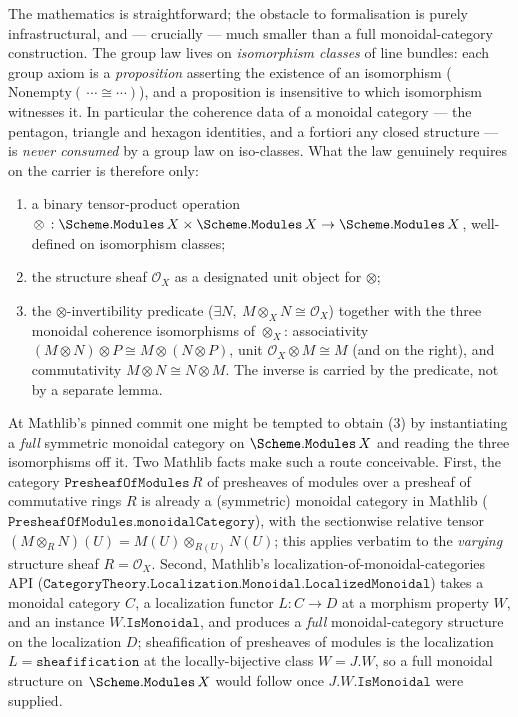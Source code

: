 The mathematics is straightforward; the obstacle to formalisation is purely
infrastructural, and --- crucially --- much smaller than a full
monoidal-category construction. The group law lives on \emph{isomorphism
classes} of line bundles: each group axiom is a \emph{proposition} asserting
the existence of an isomorphism (\(\mathrm{Nonempty}(\,\cdots \cong \cdots)\)),
and a proposition is insensitive to which isomorphism witnesses it. In
particular the coherence data of a monoidal category --- the pentagon,
triangle and hexagon identities, and a fortiori any closed structure --- is
\emph{never consumed} by a group law on iso-classes. What the law genuinely
requires on the carrier is therefore only:
\begin{enumerate}
  \item a binary tensor-product operation
    \(\otimes\, : \Scheme.\mathtt{Modules}\,X \times \Scheme.\mathtt{Modules}\,X
                  \to \Scheme.\mathtt{Modules}\,X\), well-defined on
    isomorphism classes;
  \item the structure sheaf \(\mathcal{O}_X\) as a designated unit object
    for \(\otimes\);
  \item the \(\otimes\)-invertibility predicate
    (\(\exists N,\ M \otimes_X N \cong \mathcal{O}_X\)) together with the three
    monoidal coherence isomorphisms of \(\otimes_X\): associativity
    \((M \otimes N) \otimes P \cong M \otimes (N \otimes P)\), unit
    \(\mathcal{O}_X \otimes M \cong M\) (and on the right), and commutativity
    \(M \otimes N \cong N \otimes M\). The inverse is carried by the
    predicate, not by a separate lemma.
\end{enumerate}
At Mathlib's pinned commit one might be tempted to obtain (3) by instantiating a
\emph{full} symmetric monoidal category on \(\Scheme.\mathtt{Modules}\,X\) and
reading the three isomorphisms off it. Two Mathlib facts make such a route
conceivable. First, the category \(\mathtt{PresheafOfModules}\,R\) of presheaves
of modules over a presheaf of commutative rings \(R\) is already a (symmetric)
monoidal category in Mathlib (\(\mathtt{PresheafOfModules.monoidalCategory}\)),
with the sectionwise relative tensor \((M \otimes_R N)(U) = M(U) \otimes_{R(U)}
N(U)\); this applies verbatim to the \emph{varying} structure sheaf
\(R = \mathcal{O}_X\). Second, Mathlib's localization-of-monoidal-categories API
(\(\mathtt{CategoryTheory.Localization.Monoidal.LocalizedMonoidal}\)) takes a
monoidal category \(C\), a localization functor \(L : C \to D\) at a morphism
property \(W\), and an instance \(W.\mathtt{IsMonoidal}\), and produces a
\emph{full} monoidal-category structure on the localization \(D\); sheafification
of presheaves of modules is the localization \(L = \mathtt{sheafification}\) at the
locally-bijective class \(W = J.W\), so a full monoidal structure on
\(\Scheme.\mathtt{Modules}\,X\) would follow once \(J.W.\mathtt{IsMonoidal}\) were
supplied.

